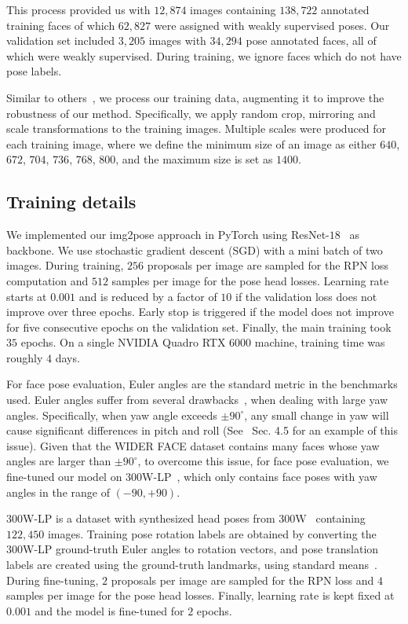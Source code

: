 \documentclass[final]{cvpr}
\newcommand{\minisection}[1]{\vspace{1mm}\noindent{\textbf{#1}.}}
\begin{document}
This process provided us with $12,874$ images containing $138,722$ annotated training faces of which $62,827$ were assigned with weakly supervised poses. Our validation set included $3,205$ images with $34,294$ pose annotated faces, all of which were weakly supervised. During training, we ignore faces which do not have pose labels. 



\minisection{Data augmentation} Similar to others~\cite{fdnet}, we process our training data, augmenting it to improve the robustness of our method. Specifically, we apply random crop, mirroring and scale transformations to the training images. Multiple scales were produced for each training image, where we define the minimum size of an image as either $640$, $672$, $704$, $736$, $768$, $800$, and the maximum size is set as $1400$. 
\subsection{Training details}\label{sec:training}
We implemented our img2pose approach in PyTorch using ResNet-$18$~\cite{resnet} as backbone. We use stochastic gradient descent (SGD) with a mini batch of two images. During training, $256$ proposals per image are sampled for the RPN loss computation and $512$ samples per image for the pose head losses. Learning rate starts at $0.001$ and is reduced by a factor of $10$ if the validation loss does not improve over three epochs. Early stop is triggered if the model does not improve for five consecutive epochs on the validation set. 
Finally, the main training took $35$ epochs. On a single NVIDIA Quadro RTX $6000$ machine, training time was roughly $4$ days.

For face pose evaluation, Euler angles are the standard metric in the benchmarks used.
Euler angles suffer from several drawbacks~\cite{trinet, quatnet}, when dealing with large yaw angles.
Specifically, when yaw angle exceeds $\pm90^{\circ}$, any small change in yaw will cause significant differences in pitch and roll (See~\cite{trinet} Sec. 4.5 for an example of this issue).
Given that the WIDER FACE dataset contains many faces whose yaw angles are larger than $\pm90^{\circ}$, 
to overcome this issue, for face pose evaluation, we fine-tuned our model on 300W-LP~\cite{3ddfa}, which only contains face poses with yaw angles in the range of $(-90, +90)$.


300W-LP is a dataset with synthesized head poses from 300W~\cite{300w} containing $122,450$ images.
Training pose rotation labels are obtained by converting the 300W-LP ground-truth Euler angles to rotation vectors, and pose translation labels are created using the ground-truth landmarks, using standard means~\cite{posit, epnp}.
During fine-tuning, $2$ proposals per image are sampled for the RPN loss and $4$ samples per image for the pose head losses.
Finally, learning rate is kept fixed at $0.001$ and the model is fine-tuned for $2$ epochs.
\end{document}
